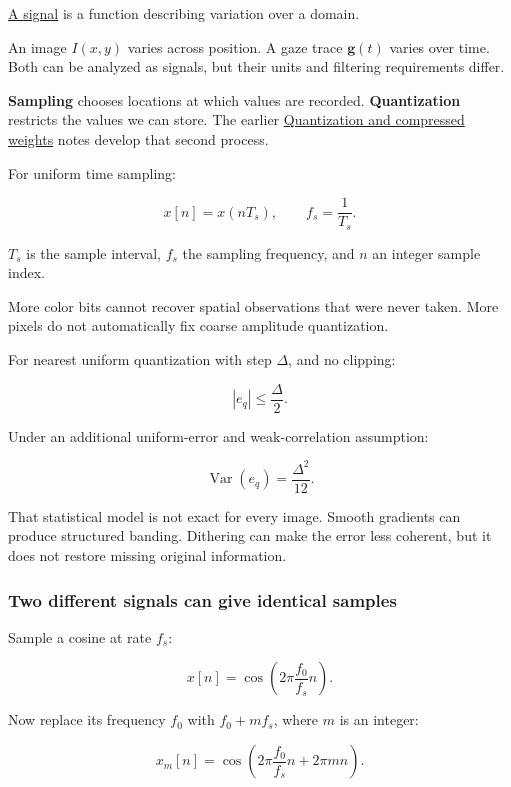 \hyperref[appendix-1077ea8fc737]{A signal} is a function describing variation over a domain.

An image \(I(x,y)\) varies across position. A gaze trace \(\mathbf g(t)\) varies over time. Both can be analyzed as signals, but their units and filtering requirements differ.

\textbf{Sampling} chooses locations at which values are recorded. \textbf{Quantization} restricts the values we can store. The earlier \hyperref[appendix-fdc7879e8bf2]{Quantization and compressed weights} notes develop that second process.

For uniform time sampling:

\[
x[n]=x(nT_s),\qquad f_s=\frac1{T_s}.
\]

\(T_s\) is the sample interval, \(f_s\) the sampling frequency, and \(n\) an integer sample index.

More color bits cannot recover spatial observations that were never taken. More pixels do not automatically fix coarse amplitude quantization.

For nearest uniform quantization with step \(\Delta\), and no clipping:

\[
|e_q|\leq\frac{\Delta}{2}.
\]

Under an additional uniform-error and weak-correlation assumption:

\[
\operatorname{Var}(e_q)=\frac{\Delta^2}{12}.
\]

That statistical model is not exact for every image. Smooth gradients can produce structured banding. Dithering can make the error less coherent, but it does not restore missing original information.

\subsubsection{Two different signals can give identical samples}\label{04-visual-computing-ii-ch042-two-different-signals-can-give-identical-samples}

\hypertarget{04-visual-computing-ii-ch042-two-different-signals-can-give-identical-samples}{}

Sample a cosine at rate \(f_s\):

\[
x[n]=\cos\left(2\pi\frac{f_0}{f_s}n\right).
\]

Now replace its frequency \(f_0\) with \(f_0+mf_s\), where \(m\) is an integer:

\[
x_m[n]
=\cos\left(2\pi\frac{f_0}{f_s}n+2\pi mn\right).
\]


